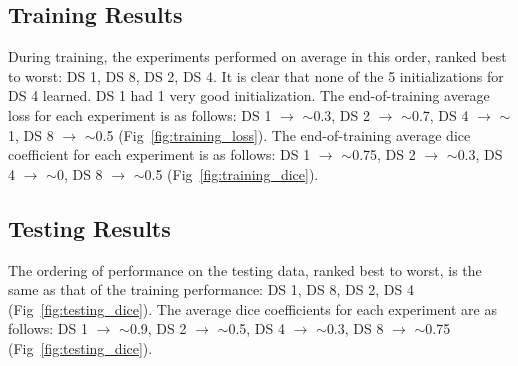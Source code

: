 \documentclass[conference]{IEEEtran}
\begin{document}
\subsection{Training Results}
During training, the experiments performed on average in this order, ranked best to worst: DS 1, DS 8, DS 2, DS 4. It is clear that none of the 5 initializations for DS 4 learned. DS 1 had 1 very good initialization. The end-of-training average loss for each experiment is as follows: DS 1 $\xrightarrow{}$ $\sim$0.3, DS 2 $\xrightarrow{}$ $\sim$0.7, DS 4 $\xrightarrow{}$ $\sim$1, DS 8 $\xrightarrow{}$ $\sim$0.5 (Fig~\ref{fig:training_loss}). The end-of-training average dice coefficient for each experiment is as follows: DS 1 $\xrightarrow{}$ $\sim$0.75, DS 2 $\xrightarrow{}$ $\sim$0.3, DS 4 $\xrightarrow{}$ $\sim$0, DS 8 $\xrightarrow{}$ $\sim$0.5 (Fig~\ref{fig:training_dice}). 



\subsection{Testing Results}
The ordering of performance on the testing data, ranked best to worst, is the same as that of the training performance:  DS 1, DS 8, DS 2, DS 4 (Fig~\ref{fig:testing_dice}). The average dice coefficients for each experiment are as follows: DS 1 $\xrightarrow{}$ $\sim$0.9, DS 2 $\xrightarrow{}$ $\sim$0.5, DS 4 $\xrightarrow{}$ $\sim$0.3, DS 8 $\xrightarrow{}$ $\sim$0.75 (Fig~\ref{fig:testing_dice}). 
\end{document}

